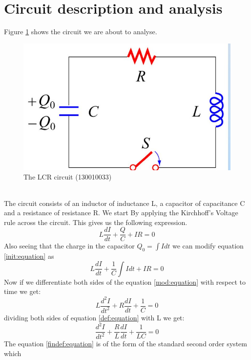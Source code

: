\documentclass[12pt,a4paper]{report}
\begin{document}
\section{Circuit description and analysis}
Figure \ref{fig:circuit} shows the circuit we are about to analyse.
\begin{figure}[h!]
\includegraphics[width=\linewidth]{lcr.jpg}
\caption{The LCR circuit (130010033)}
\label{fig:circuit}
\end{figure}\\
The circuit consists of an inductor of inductance L, a capacitor of capacitance C and a resistance of resistance R.
We start By applying the Kirchhoff's Voltage rule across the circuit. This gives us the following expression.
\begin{equation}
L\frac{dI}{dt}+\frac{Q}{C}+IR=0
\label{init:equation}
\end{equation}
Also seeing that the charge in the capacitor $Q_0=\int{Idt}$ we can modify equation \textcolor{blue}{\ref{init:equation}} as
\begin{equation}
L\frac{dI}{dt}+\frac{1}{C}\int{Idt}+IR=0
\label{mod:equation}
\end{equation}
Now if we differentiate both sides of the equation \textcolor{blue}{\ref{mod:equation}} with respect to time we get:
\begin{equation}
L\frac{d^2I}{dt^2}+R\frac{dI}{dt}+\frac{1}{C}=0
\label{def:equation}
\end{equation}
dividing both sides of equation \textcolor{blue}{\ref{def:equation}} with L we get:
\begin{equation}
\frac{d^2I}{dt^2}+\frac{R}{L}\frac{dI}{dt}+\frac{1}{LC}=0
\label{findef:equation}
\end{equation}
The equation \textcolor{blue}{\ref{findef:equation}} is of the form of the standard second order system which
\end{document}
